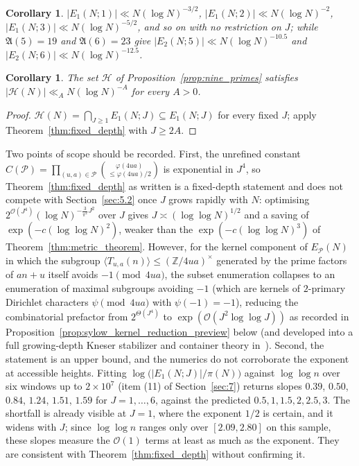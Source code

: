 \documentclass[11pt, a4paper]{article}
\theoremstyle{plain}
\newtheorem{corollary}[theorem]{Corollary}
\theoremstyle{definition}
\newcommand{\Z}{\mathbb{Z}}
\begin{document}
\begin{corollary}\label{cor:fixed_depth_small}
$|E_1(N;1)|\ll N(\log N)^{-3/2}$, $|E_1(N;2)|\ll N(\log N)^{-2}$, $|E_1(N;3)|\ll N(\log N)^{-5/2}$, and so on with no restriction on $J$; while $\mathfrak{A}(5)=19$ and $\mathfrak{A}(6)=23$ give $|E_2(N;5)|\ll N(\log N)^{-10.5}$ and $|E_2(N;6)|\ll N(\log N)^{-12.5}$.
\end{corollary}

\begin{corollary}\label{cor:H_density}
The set $\mathcal{H}$ of Proposition~\ref{prop:nine_primes} satisfies $|\mathcal{H}(N)|\ll_A N(\log N)^{-A}$ for every $A>0$.
\end{corollary}
\begin{proof}
$\mathcal{H}(N)=\bigcap_{J\ge1}E_1(N;J)\subseteq E_1(N;J)$ for every fixed $J$; apply Theorem~\ref{thm:fixed_depth} with $J\ge2A$.
\end{proof}

Two points of scope should be recorded. First, the unrefined constant $C(\mathcal{P})=\prod_{(u,a)\in\mathcal{P}}\binom{\varphi(4ua)}{\le\varphi(4ua)/2}$ is exponential in $J^{4}$, so Theorem~\ref{thm:fixed_depth} as written is a fixed-depth statement and does not compete with Section~\ref{sec:5.2} once $J$ grows rapidly with $N$: optimising $2^{\mathcal{O}(J^{4})}(\log N)^{-\frac{3}{\pi^2}J^{2}}$ over $J$ gives $J\asymp(\log\log N)^{1/2}$ and a saving of $\exp(-c(\log\log N)^{2})$, weaker than the $\exp(-c(\log\log N)^{3})$ of Theorem~\ref{thm:metric_theorem}. However, for the kernel component of $E_{\mathcal{P}}(N)$ in which the subgroup $\langle T_{u,a}(n)\rangle\le(\Z/4ua)^{\times}$ generated by the prime factors of $an+u$ itself avoids $-1\pmod{4ua}$, the subset enumeration collapses to an enumeration of maximal subgroups avoiding $-1$ (which are kernels of $2$-primary Dirichlet characters $\psi\pmod{4ua}$ with $\psi(-1)=-1$), reducing the combinatorial prefactor from $2^{\Theta(J^{4})}$ to $\exp(\mathcal{O}(J^{2}\log\log J))$ as recorded in Proposition~\ref{prop:sylow_kernel_reduction_preview} below (and developed into a full growing-depth Kneser stabilizer and container theory in~\cite{dahan2026b}). Second, the statement is an upper bound, and the numerics do not corroborate the exponent at accessible heights. Fitting $\log\big(|E_1(N;J)|/\pi(N)\big)$ against $\log\log n$ over six windows up to $2\times10^{7}$ (item (11) of Section~\ref{sec:7}) returns slopes $0.39$, $0.50$, $0.84$, $1.24$, $1.51$, $1.59$ for $J=1,\dots,6$, against the predicted $0.5,1,1.5,2,2.5,3$. The shortfall is already visible at $J=1$, where the exponent $1/2$ is certain, and it widens with $J$; since $\log\log n$ ranges only over $[2.09,2.80]$ on this sample, these slopes measure the $\mathcal{O}(1)$ terms at least as much as the exponent. They are consistent with Theorem~\ref{thm:fixed_depth} without confirming it.
\end{document}
